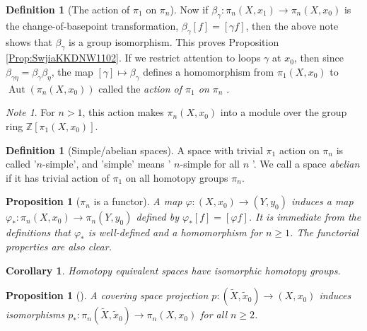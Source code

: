 \documentclass[reqno]{amsart}
\newtheorem{proposition}[theorem]{Proposition}
\newtheorem{corollary}[theorem]{Corollary}
\theoremstyle{definition}
\newtheorem{definition}[theorem]{Definition}
\theoremstyle{remark}
\newtheorem*{note}{Note}
\DeclareMathOperator{\Aut}{Aut}
\begin{document}
\begin{definition}[The action of $\pi_1$ on $\pi_n$]
  Now if $\beta_{\gamma} \colon \pi_n(X,x_1) \to 
  \pi_n(X, x_0)$ is the change-of-basepoint transformation,
   $\beta_{\gamma}\left[ f \right] =
   \left[ \gamma f \right] $, then
   the above note shows that $\beta_\gamma$ is a group isomorphism.
   This proves Proposition \ref{Prop:SwjiaKKDNW1102}. 
   If we restrict attention to loops
   $\gamma$ at $x_0$, then since $\beta_{\gamma \eta}=
   \beta_{\gamma} \beta_{\eta}$, the map
   $\left[ \gamma \right] \mapsto \beta_{\gamma}$ 
   defines a homomorphism from
   $\pi_1\left( X, x_0 \right) $ to
   $\Aut \left( \pi_n \left( X,x_0 \right)  \right) $ 
   called the \textit{action of $\pi_1$ on $\pi_n$ }.
  \end{definition}

  \begin{note}
  For $n>1$, this action makes
  $\pi_n(X,x_0)$ into a module over the group ring
  $\mathbb{Z}\left[ \pi_1 \left( X,x_0 \right)  \right] $.
  \end{note}  

  \begin{definition}[Simple/abelian spaces]
      A space with trivial $\pi_1$ action on $\pi_n$ is called
      '$n$-simple', and 'simple' means
      ' $n$-simple for all $n$ '. We call
      a space \textit{abelian} if it has
      trivial action of $\pi_1$ on all homotopy groups
      $\pi_n$.
  \end{definition}

  \begin{proposition}[$\pi_n$ is a functor]
      A map $\varphi  \colon \left( X, x_0 \right) \to 
      \left( Y, y_0 \right) $ induces a map
      $\varphi_* \colon \pi_n \left( X, x_0 \right) \to 
      \pi_n \left( Y, y_0 \right) $ defined by
      $\varphi_* \left[ f \right] = \left[ \varphi  f \right] $.
      It is immediate from the definitions that
      $\varphi_*$ is well-defined and a homomorphism
      for $n\ge 1$. The functorial properties are also clear.
  \end{proposition}

  \begin{corollary}
      Homotopy equivalent spaces have isomorphic
      homotopy groups.
  \end{corollary}

  \begin{proposition}[]
      A covering space projection
      $p \colon \left( \tilde{X}, \tilde{x}_0 \right) \to 
      \left( X, x_0 \right) $ induces isomorphisms
      $p_* \colon \pi_n \left( \tilde{X}, \tilde{x}_0 \right) 
      \to \pi_n \left( X, x_0 \right) $ for all
      $n \ge 2$.
  \end{proposition}
\end{document}
